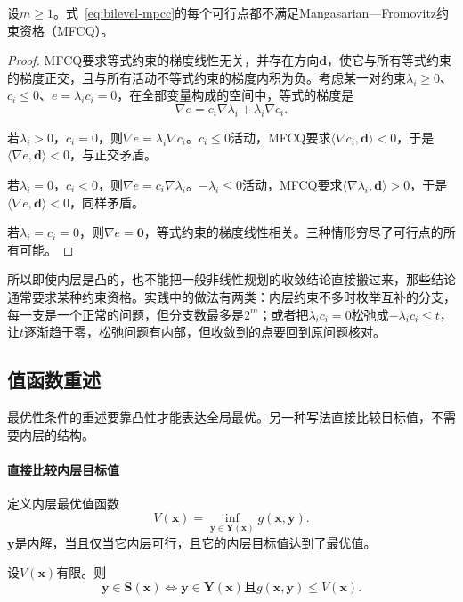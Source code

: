 \begin{lemma}[互补约束破坏MFCQ]
\label{lem:bilevel-mfcq-fails}
设$m\geq1$。式~\eqref{eq:bilevel-mpcc}的每个可行点都不满足Mangasarian—Fromovitz约束资格（MFCQ）。
\end{lemma}

\begin{proof}
MFCQ要求等式约束的梯度线性无关，并存在方向$\bm{d}$，使它与所有等式约束的梯度正交，且与所有活动不等式约束的梯度内积为负。考虑某一对约束$\lambda_i\geq0$、$c_i\leq0$、$e=\lambda_ic_i=0$，在全部变量构成的空间中，等式的梯度是
\[
 \nabla e=c_i\nabla\lambda_i+\lambda_i\nabla c_i.
\]

若$\lambda_i>0$，$c_i=0$，则$\nabla e=\lambda_i\nabla c_i$。$c_i\leq0$活动，MFCQ要求$\langle\nabla c_i,\bm{d}\rangle<0$，于是$\langle\nabla e,\bm{d}\rangle<0$，与正交矛盾。

若$\lambda_i=0$，$c_i<0$，则$\nabla e=c_i\nabla\lambda_i$。$-\lambda_i\leq0$活动，MFCQ要求$\langle\nabla\lambda_i,\bm{d}\rangle>0$，于是$\langle\nabla e,\bm{d}\rangle<0$，同样矛盾。

若$\lambda_i=c_i=0$，则$\nabla e=\bm{0}$，等式约束的梯度线性相关。三种情形穷尽了可行点的所有可能。
\end{proof}

所以即使内层是凸的，也不能把一般非线性规划的收敛结论直接搬过来，那些结论通常要求某种约束资格。实践中的做法有两类：内层约束不多时枚举互补的分支，每一支是一个正常的问题，但分支数最多是$2^m$；或者把$\lambda_ic_i=0$松弛成$-\lambda_ic_i\leq t$，让$t$逐渐趋于零，松弛问题有内部，但收敛到的点要回到原问题核对。

\subsection{值函数重述}
\label{sec:bilevel-value-reformulation}

最优性条件的重述要靠凸性才能表达全局最优。另一种写法直接比较目标值，不需要内层的结构。

\paragraph{直接比较内层目标值}
定义内层最优值函数
\begin{equation}
 V(\bm{x})=\inf_{\bm{y}\in\bm{Y}(\bm{x})}g(\bm{x},\bm{y}).
 \label{eq:bilevel-value-function}
\end{equation}
$\bm{y}$是内解，当且仅当它内层可行，且它的内层目标值达到了最优值。

\begin{lemma}[值函数重述]
\label{lem:bilevel-value-reformulation}
设$V(\bm{x})$有限。则
\begin{equation}
 \bm{y}\in\bm{S}(\bm{x})\iff\bm{y}\in\bm{Y}(\bm{x})\text{且}g(\bm{x},\bm{y})\leq V(\bm{x}).
 \label{eq:bilevel-value-constraint}
\end{equation}
\end{lemma}

